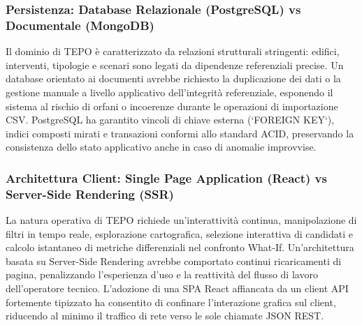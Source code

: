 \subsubsection{Persistenza: Database Relazionale (PostgreSQL) vs Documentale (MongoDB)}
Il dominio di TEPO è caratterizzato da relazioni strutturali stringenti: edifici, interventi, tipologie e scenari sono legati da dipendenze referenziali precise. Un database orientato ai documenti avrebbe richiesto la duplicazione dei dati o la gestione manuale a livello applicativo dell'integrità referenziale, esponendo il sistema al rischio di orfani o incoerenze durante le operazioni di importazione CSV. PostgreSQL ha garantito vincoli di chiave esterna (`FOREIGN KEY`), indici composti mirati e transazioni conformi allo standard ACID, preservando la consistenza dello stato applicativo anche in caso di anomalie improvvise.

\subsubsection{Architettura Client: Single Page Application (React) vs Server-Side Rendering (SSR)}
La natura operativa di TEPO richiede un'interattività continua, manipolazione di filtri in tempo reale, esplorazione cartografica, selezione interattiva di candidati e calcolo istantaneo di metriche differenziali nel confronto What-If. Un'architettura basata su Server-Side Rendering avrebbe comportato continui ricaricamenti di pagina, penalizzando l'esperienza d'uso e la reattività del flusso di lavoro dell'operatore tecnico. L'adozione di una SPA React affiancata da un client API fortemente tipizzato ha consentito di confinare l'interazione grafica sul client, riducendo al minimo il traffico di rete verso le sole chiamate JSON REST.
